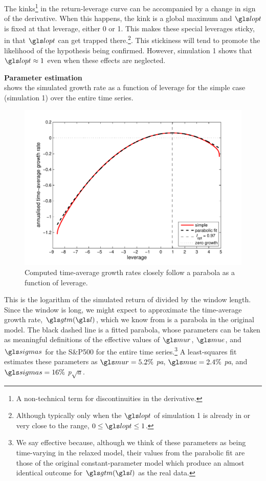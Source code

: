 The kinks\footnote{A non-technical term for discontinuities in the derivative.} in the return-leverage curve can be accompanied by a change in sign of the derivative. When this happens, the kink is a global maximum and $\lopt$ is fixed at that leverage, either 0 or 1. This makes these special leverages sticky, in that $\lopt$ can get trapped there.\footnote{Although typically only when the $\lopt$ of simulation 1 is already in or very close to the range, $0\leq\lopt\leq1$.}. This stickiness will tend to promote the likelihood of the hypothesis being confirmed. However, simulation 1 shows that $\lopt\approx1$ even when these effects are neglected.

\textbf{Parameter estimation}\\
 shows the simulated growth rate as a function of leverage for the simple case (simulation 1) over the entire time series.
\begin{figure}
\centering
\includegraphics[width=\textwidth]{./chapter_4/figs/sme_fig2.pdf}
\caption{Computed time-average growth rates closely follow a parabola as a function of leverage.}
\end{figure}
This is the logarithm of the simulated return of  divided by the window length. Since the window is long, we might expect to approximate the time-average growth rate, $\gtm(\l)$, which we know from  is a parabola in the original \GBM model. The black dashed line is a fitted parabola, whose parameters can be taken as meaningful definitions of the effective values of $\mur$, $\mue$, and $\sigmas$ for the S\&P500 for the entire time series.\footnote{We say effective because, although we think of these parameters as being time-varying in the relaxed model, their values from the parabolic fit are those of the original constant-parameter model which produce an almost identical outcome for $\gtm(\l)$ as the real data.} A least-squares fit estimates these parameters as $\mur=5.2\%$ \textit{pa}, $\mue=2.4\%$ \textit{pa}, and $\sigmas=16\%$ \textit{p$\sqrt{\mathit{a}}$}.

